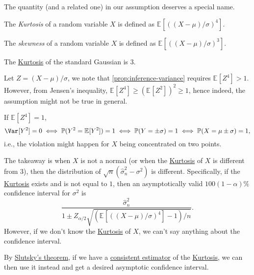 The quantity (and a related one) in our assumption deserves a special name.

\begin{definition}[Kurtosis]\label{def:Kurtosis}
	The \emph{Kurtosis} of a random variable \(X\) is defined as \(\mathbb{E}_{}[( (X-\mu ) / \sigma )^4]\).
\end{definition}

\begin{definition}[Skewness]\label{def:skewness}
	The \emph{skewness} of a random variable \(X\) is defined as \(\mathbb{E}_{}[( (X-\mu ) / \sigma )^3]\).
\end{definition}

\begin{eg}
	The \hyperref[def:Kurtosis]{Kurtosis} of the standard Gaussian is \(3\).
\end{eg}

Let \(Z = (X-\mu ) / \sigma \), we note that \autoref{prop:inference-variance} requires \(\mathbb{E}_{}[Z^4] > 1\). However, from Jensen's inequality, \(\mathbb{E}_{}[Z^4] \geq \left( \mathbb{E}_{}[Z^2] \right) ^2 \geq 1\), hence indeed, the assumption might not be true in general.

\begin{eg}
	If \(\mathbb{E}_{}[Z^4] = 1\),
	\[
		\Var_{}[Y^2] = 0
		\iff \mathbb{P} (Y^2 = \mathbb{E}_{}[Y^2] ) = 1
		\iff \mathbb{P} (Y = \pm \sigma ) = 1
		\iff \mathbb{P} (X = \mu \pm \sigma ) = 1,
	\]
	i.e., the violation might happen for \(X\) being concentrated on two points.
\end{eg}

The takeaway is when \(X\) is not a normal (or when the \hyperref[def:Kurtosis]{Kurtosis} of \(X\) is different from \(3\)), then the distribution of \(\sqrt{n} (\hat{\sigma} _n^2 - \sigma ^2)\) is different. Specifically, if the \hyperref[def:Kurtosis]{Kurtosis} exists and is not equal to \(1\), then an asymptotically valid \(100 (1 - \alpha )\%\) confidence interval for \(\sigma ^2\) is
\[
	\frac{\hat{\sigma} _n^2}{1 \pm Z_{\alpha / 2} \sqrt{(\mathbb{E}_{}[((X - \mu ) / \sigma )^4]  - 1) / n} }.
\]
However, if we don't know the \hyperref[def:Kurtosis]{Kurtosis} of \(X\), we can't say anything about the confidence interval.

\begin{intuition}
	By \hyperref[thm:Slutsky]{Slutsky's theorem}, if we have a \hyperref[def:consistent]{consistent estimator} of the \hyperref[def:Kurtosis]{Kurtosis}, we can then use it instead and get a desired asymptotic confidence interval.
\end{intuition}
